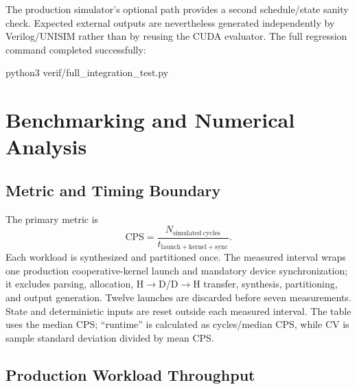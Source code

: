 \documentclass[11pt,a4paper]{article}
\newcommand{\code}[1]{\texttt{\detokenize{#1}}}
\begin{document}
The production simulator's optional \code{--check-with-cpu} path provides a
second schedule/state sanity check.  Expected external outputs are nevertheless
generated independently by Verilog/UNISIM rather than by reusing the CUDA
evaluator.  The full regression command completed successfully:
\begin{center}
\ttfamily python3 verif/full\_integration\_test.py
\end{center}

\section{Benchmarking and Numerical Analysis}

\subsection{Metric and Timing Boundary}

The primary metric is
\[
 \mathrm{CPS}=\frac{N_{\mathrm{simulated\ cycles}}}{t_{\mathrm{launch+kernel+sync}}}.
\]
Each workload is synthesized and partitioned once.  The measured interval wraps
one production cooperative-kernel launch and mandatory device synchronization;
it excludes parsing, allocation, H$\rightarrow$D/D$\rightarrow$H transfer,
synthesis, partitioning, and output generation.  Twelve launches are discarded
before seven measurements.  State and deterministic inputs are reset outside
each measured interval.  The table uses the median CPS; ``runtime'' is calculated
as cycles/median CPS, while CV is sample standard deviation divided by mean CPS.

\subsection{Production Workload Throughput}
\end{document}
